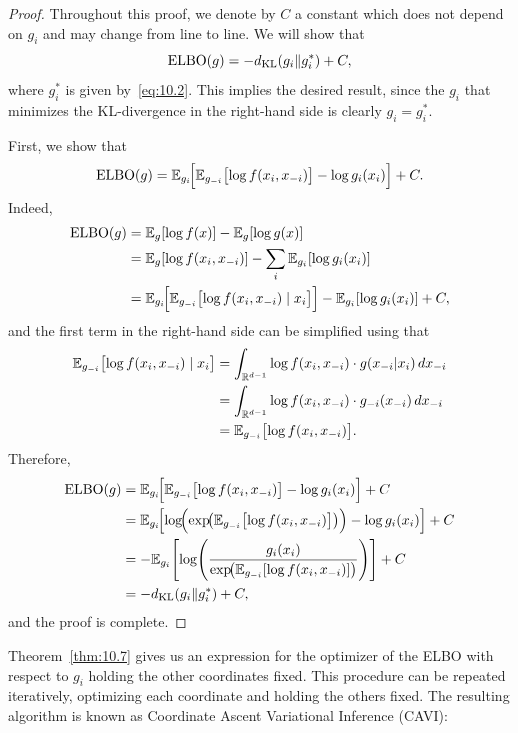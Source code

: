 \begin{proof}
Throughout this proof, we denote by $C$ a constant which does not depend on $g_i$ and may change
from line to line. We will show that
\[
  \mathrm{ELBO}(g) = -d_{\mathrm{KL}}(g_i \| g_i^*) + C,
\]
where $g_i^*$ is given by~\eqref{eq:10.2}. This implies the desired result, since the $g_i$ that
minimizes the KL-divergence in the right-hand side is clearly $g_i = g_i^*$.

First, we show that
\[
  \mathrm{ELBO}(g) = \mathbb{E}_{g_i}\!\Bigl[\mathbb{E}_{g_{-i}}\bigl[\log f(x_i, x_{-i})\bigr]
             - \log g_i(x_i)\Bigr] + C.
\]
Indeed,
\begin{align*}
  \mathrm{ELBO}(g)
    &= \mathbb{E}_g[\log f(x)] - \mathbb{E}_g[\log g(x)] \\
    &= \mathbb{E}_g[\log f(x_i, x_{-i})] - \sum_i \mathbb{E}_{g_i}[\log g_i(x_i)] \\
    &= \mathbb{E}_{g_i}\!\Bigl[\mathbb{E}_{g_{-i}}\bigl[\log f(x_i, x_{-i}) \mid x_i\bigr]\Bigr]
       - \mathbb{E}_{g_i}[\log g_i(x_i)] + C,
\end{align*}
and the first term in the right-hand side can be simplified using that
\begin{align*}
  \mathbb{E}_{g_{-i}}\bigl[\log f(x_i, x_{-i}) \mid x_i\bigr]
    &= \int_{\mathbb{R}^{d-1}} \log f(x_i, x_{-i})\cdot g(x_{-i}|x_i)\,dx_{-i} \\
    &= \int_{\mathbb{R}^{d-1}} \log f(x_i, x_{-i})\cdot g_{-i}(x_{-i})\,dx_{-i} \\
    &= \mathbb{E}_{g_{-i}}\bigl[\log f(x_i, x_{-i})\bigr].
\end{align*}
Therefore,
\begin{align*}
  \mathrm{ELBO}(g)
    &= \mathbb{E}_{g_i}\!\Bigl[\mathbb{E}_{g_{-i}}\bigl[\log f(x_i, x_{-i})\bigr] - \log g_i(x_i)\Bigr] + C \\
    &= \mathbb{E}_{g_i}\!\Bigl[\log\!\Bigl(\exp\!\bigl(\mathbb{E}_{g_{-i}}\bigl[\log f(x_i, x_{-i})\bigr]\bigr)\Bigr)
       - \log g_i(x_i)\Bigr] + C \\
    &= -\mathbb{E}_{g_i}\!\left[\log\!\left(\frac{g_i(x_i)}{\exp\!\bigl(\mathbb{E}_{g_{-i}}[\log f(x_i,x_{-i})]\bigr)}\right)\right] + C \\
    &= -d_{\mathrm{KL}}(g_i \| g_i^*) + C,
\end{align*}
and the proof is complete.
\end{proof}

Theorem~\ref{thm:10.7} gives us an expression for the optimizer of the ELBO with respect to $g_i$
holding the other coordinates fixed. This procedure can be repeated iteratively, optimizing each
coordinate and holding the others fixed. The resulting algorithm is known as Coordinate Ascent
Variational Inference (CAVI):

